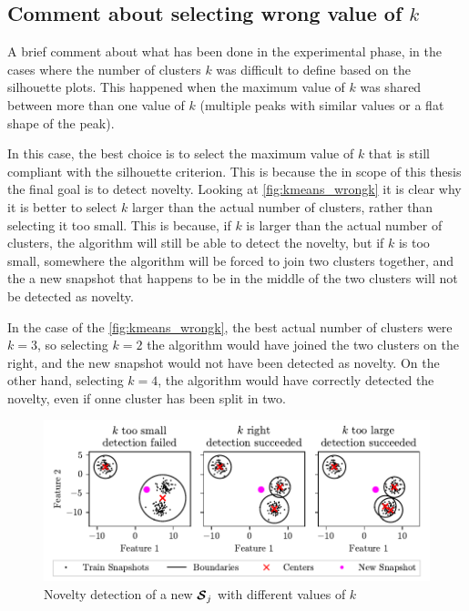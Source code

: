 \subsection{Comment about selecting wrong value of $k$}
\label{sec:wrong_k}
A brief comment about what has been done in the experimental phase, in the cases where the number of clusters $k$ was difficult to define based on the silhouette plots. This happened when the maximum value of $k$ was shared between more than one value of $k$ (multiple peaks with similar values or a flat shape of the peak).

In this case, the best choice is to select the maximum value of $k$ that is still compliant with the silhouette criterion. This is because the in scope of this thesis the final goal is to detect novelty. 
Looking at \autoref{fig:kmeans_wrongk} it is clear why it is better to select $k$ larger than the actual number of clusters, rather than selecting it too small. This is because, if $k$ is larger than the actual number of clusters, the algorithm will still be able to detect the novelty, but if $k$ is too small, somewhere the algorithm will be forced to join two clusters together, and the a new snapshot that happens to be in the middle of the two clusters will not be detected as novelty. 

In the case of the \autoref{fig:kmeans_wrongk}, the best actual number of clusters were $k=3$, so selecting $k=2$ the algorithm would have joined the two clusters on the right, and the new snapshot would not have been detected as novelty. On the other hand, selecting $k=4$, the algorithm would have correctly detected the novelty, even if onne cluster has been split in two.

\begin{figure}
  \centering
  \includegraphics[width=\textwidth]{images/Kmeans_wrongk.pdf}
  \caption{Novelty detection of a new $\bm{\mathcal{S}}_j$ with different values of $k$}
  \label{fig:kmeans_wrongk}
\end{figure}

